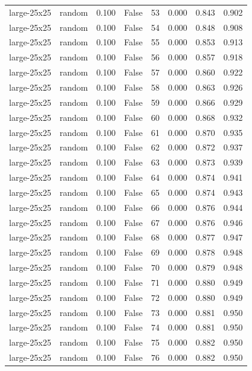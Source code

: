 \begin{tabular}{llrrrrrr}
large-25x25 & random & 0.100 & False & 53 & 0.000 & 0.843 & 0.902 \\
large-25x25 & random & 0.100 & False & 54 & 0.000 & 0.848 & 0.908 \\
large-25x25 & random & 0.100 & False & 55 & 0.000 & 0.853 & 0.913 \\
large-25x25 & random & 0.100 & False & 56 & 0.000 & 0.857 & 0.918 \\
large-25x25 & random & 0.100 & False & 57 & 0.000 & 0.860 & 0.922 \\
large-25x25 & random & 0.100 & False & 58 & 0.000 & 0.863 & 0.926 \\
large-25x25 & random & 0.100 & False & 59 & 0.000 & 0.866 & 0.929 \\
large-25x25 & random & 0.100 & False & 60 & 0.000 & 0.868 & 0.932 \\
large-25x25 & random & 0.100 & False & 61 & 0.000 & 0.870 & 0.935 \\
large-25x25 & random & 0.100 & False & 62 & 0.000 & 0.872 & 0.937 \\
large-25x25 & random & 0.100 & False & 63 & 0.000 & 0.873 & 0.939 \\
large-25x25 & random & 0.100 & False & 64 & 0.000 & 0.874 & 0.941 \\
large-25x25 & random & 0.100 & False & 65 & 0.000 & 0.874 & 0.943 \\
large-25x25 & random & 0.100 & False & 66 & 0.000 & 0.876 & 0.944 \\
large-25x25 & random & 0.100 & False & 67 & 0.000 & 0.876 & 0.946 \\
large-25x25 & random & 0.100 & False & 68 & 0.000 & 0.877 & 0.947 \\
large-25x25 & random & 0.100 & False & 69 & 0.000 & 0.878 & 0.948 \\
large-25x25 & random & 0.100 & False & 70 & 0.000 & 0.879 & 0.948 \\
large-25x25 & random & 0.100 & False & 71 & 0.000 & 0.880 & 0.949 \\
large-25x25 & random & 0.100 & False & 72 & 0.000 & 0.880 & 0.949 \\
large-25x25 & random & 0.100 & False & 73 & 0.000 & 0.881 & 0.950 \\
large-25x25 & random & 0.100 & False & 74 & 0.000 & 0.881 & 0.950 \\
large-25x25 & random & 0.100 & False & 75 & 0.000 & 0.882 & 0.950 \\
large-25x25 & random & 0.100 & False & 76 & 0.000 & 0.882 & 0.950 \\

\end{tabular}
